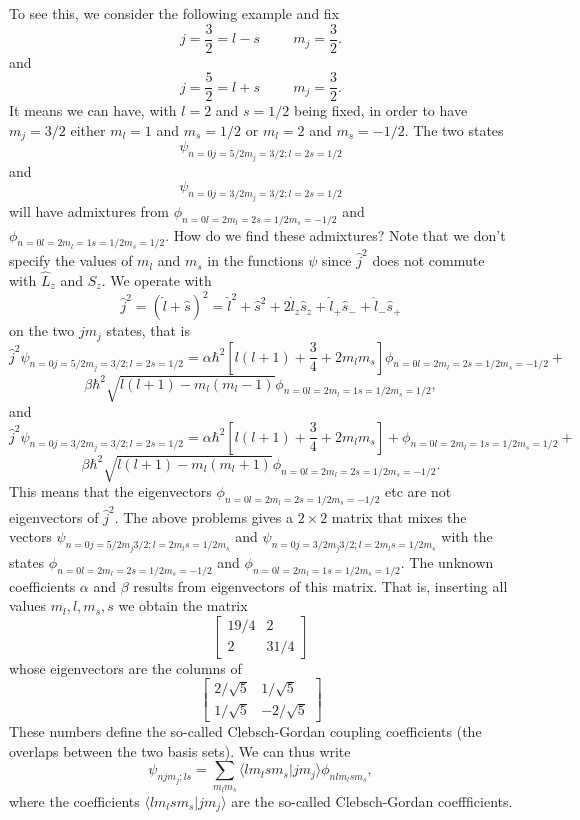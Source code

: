 \documentclass[graybox,sectrefs,envcountresetchap,open=right]{svmonodo}
\begin{document}
\noindent
To see this, we consider the following example and fix
\[
j=\frac{3}{2}=l-s\hspace{1cm} m_j=\frac{3}{2}.
\]
and
\[
j=\frac{5}{2}=l+s\hspace{1cm} m_j=\frac{3}{2}.
\]
It means we can have, with $l=2$ and $s=1/2$ being fixed, in order to have $m_j=3/2$ either $m_l=1$ and $m_s=1/2$ or
$m_l=2$ and $m_s=-1/2$. The two states    
\[
\psi_{n=0j=5/2m_j=3/2;l=2s=1/2}
\]
and
\[
\psi_{n=0j=3/2m_j=3/2;l=2s=1/2}
\]
will have admixtures from $\phi_{n=0l=2m_l=2s=1/2m_s=-1/2}$ and $\phi_{n=0l=2m_l=1s=1/2m_s=1/2}$. 
How do we find these admixtures? Note that we don't specify the values of $m_l$ and $m_s$ 
in the functions $\psi$ since    
$\hat{j}^2$ does not commute with $\hat{L}_z$ and $\hat{S}_z$. 
We operate with 
\[
   \hat{j}^2=(\hat{l}+\hat{s})^2=\hat{l}^2+\hat{s}^2+2\hat{l}_z\hat{s}_z+\hat{l}_+\hat{s}_{-}+\hat{l}_{-}\hat{s}_{+}
\]
on the two $jm_j$ states, that is
\[
\hat{j}^2\psi_{n=0j=5/2m_j=3/2;l=2s=1/2}= \alpha\hbar^2[l(l+1)+\frac{3}{4}+2m_lm_s]\phi_{n=0l=2m_l=2s=1/2m_s=-1/2}+
\]
\[
\beta\hbar^2\sqrt{l(l+1)-m_l(m_l-1)}\phi_{n=0l=2m_l=1s=1/2m_s=1/2},
\]
and
\[
\hat{j}^2\psi_{n=0j=3/2m_j=3/2;l=2s=1/2}= \alpha\hbar^2[l(l+1)+\frac{3}{4}+2m_lm_s]+ \phi_{n=0l=2m_l=1s=1/2m_s=1/2}+
\]
\[
\beta\hbar^2\sqrt{l(l+1)-m_l(m_l+1)}\phi_{n=0l=2m_l=2s=1/2m_s=-1/2}.
\]
This means that the eigenvectors $\phi_{n=0l=2m_l=2s=1/2m_s=-1/2}$ etc are not eigenvectors of $\hat{j}^2$. The above problems gives a $2\times2$ matrix that mixes the vectors $\psi_{n=0j=5/2m_j3/2;l=2m_ls=1/2m_s}$ and $\psi_{n=0j=3/2m_j3/2;l=2m_ls=1/2m_s}$ with the states  $\phi_{n=0l=2m_l=2s=1/2m_s=-1/2}$ and
$\phi_{n=0l=2m_l=1s=1/2m_s=1/2}$. The unknown coefficients $\alpha$ and $\beta$ results from eigenvectors of this matrix. That is, inserting all values $m_l,l,m_s,s$ we obtain the matrix 
\[
\left[ \begin{array} {cc} 19/4 & 2 \\ 2 & 31/4 \end{array} \right]\]
whose eigenvectors are the columns of
\[
\left[ \begin{array} {cc} 2/\sqrt{5} &1/\sqrt{5}  \\ 1/\sqrt{5} & -2/\sqrt{5} \end{array}\right]\]  
These numbers define the so-called Clebsch-Gordan coupling coefficients  (the overlaps between the two basis sets). We can thus write
\[
\psi_{njm_j;ls}=\sum_{m_lm_s}\langle lm_lsm_s|jm_j\rangle\phi_{nlm_lsm_s},
\]
where the coefficients $\langle lm_lsm_s|jm_j\rangle$ are the so-called Clebsch-Gordan coeffficients.
\end{document}
